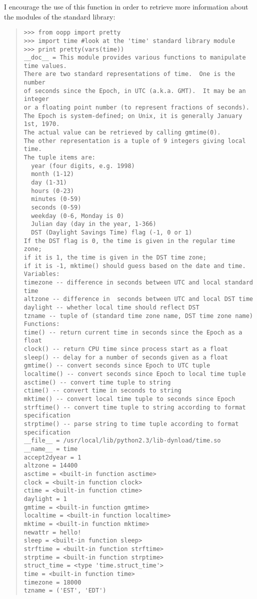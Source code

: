 \documentclass[10pt,english]{article}
\begin{document}
I encourage the use of this function in order to retrieve more 
information about the modules of the standard library:
\begin{quote}
\begin{verbatim}>>> from oopp import pretty
>>> import time #look at the 'time' standard library module
>>> print pretty(vars(time))
__doc__ = This module provides various functions to manipulate time values.
There are two standard representations of time.  One is the number
of seconds since the Epoch, in UTC (a.k.a. GMT).  It may be an integer
or a floating point number (to represent fractions of seconds).
The Epoch is system-defined; on Unix, it is generally January 1st, 1970.
The actual value can be retrieved by calling gmtime(0).
The other representation is a tuple of 9 integers giving local time.
The tuple items are:
  year (four digits, e.g. 1998)
  month (1-12)
  day (1-31)
  hours (0-23)
  minutes (0-59)
  seconds (0-59)
  weekday (0-6, Monday is 0)
  Julian day (day in the year, 1-366)
  DST (Daylight Savings Time) flag (-1, 0 or 1)
If the DST flag is 0, the time is given in the regular time zone;
if it is 1, the time is given in the DST time zone;
if it is -1, mktime() should guess based on the date and time.
Variables:
timezone -- difference in seconds between UTC and local standard time
altzone -- difference in  seconds between UTC and local DST time
daylight -- whether local time should reflect DST
tzname -- tuple of (standard time zone name, DST time zone name)
Functions:
time() -- return current time in seconds since the Epoch as a float
clock() -- return CPU time since process start as a float
sleep() -- delay for a number of seconds given as a float
gmtime() -- convert seconds since Epoch to UTC tuple
localtime() -- convert seconds since Epoch to local time tuple
asctime() -- convert time tuple to string
ctime() -- convert time in seconds to string
mktime() -- convert local time tuple to seconds since Epoch
strftime() -- convert time tuple to string according to format specification
strptime() -- parse string to time tuple according to format specification
__file__ = /usr/local/lib/python2.3/lib-dynload/time.so
__name__ = time
accept2dyear = 1
altzone = 14400
asctime = <built-in function asctime>
clock = <built-in function clock>
ctime = <built-in function ctime>
daylight = 1
gmtime = <built-in function gmtime>
localtime = <built-in function localtime>
mktime = <built-in function mktime>
newattr = hello!
sleep = <built-in function sleep>
strftime = <built-in function strftime>
strptime = <built-in function strptime>
struct_time = <type 'time.struct_time'>
time = <built-in function time>
timezone = 18000
tzname = ('EST', 'EDT')\end{verbatim}
\end{quote}
\end{document}
